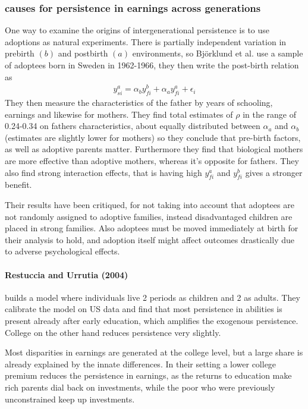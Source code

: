 \documentclass[12pt, a4paper]{article}
\begin{document}
\begin{multicols}{2}
\subsubsection{causes for persistence in earnings across generations}
One way to examine the origins of intergenerational persistence is to use adoptions as natural experiments. There is partially independent variation in prebirth $(b)$ and postbirth $(a)$ environments, so Björklund et al. use a sample of adoptees born in Sweden in 1962-1966, they then write the post-birth relation as 
\begin{align*}
y_{si}^a = \alpha_b y_{fi}^b + \alpha_a y_{fi}^a + \epsilon_i
\end{align*}
They then measure the characteristics of the father by years of schooling, earnings and likewise for mothers. They find total estimates of $\rho$ in the range of 0.24-0.34 on fathers characteristics, about equally distributed between $\alpha_a$ and $\alpha_b$ (estimates are slightly lower for mothers) so they conclude that pre-birth factors, as well as adoptive parents matter. Furthermore they find that biological mothers are more effective than adoptive mothers, whereas it's opposite for fathers. They also find strong interaction effects, that is having high $y_{fi}^a$ and $y_{fi}^b$ gives a stronger benefit.

Their results have been critiqued, for not taking into account that adoptees are not randomly assigned to adoptive families, instead disadvantaged children are placed in strong families. Also adoptees must be moved immediately at birth for their analysis to hold, and adoption itself might affect outcomes drastically due to adverse psychological effects. 

\paragraph{Restuccia and Urrutia (2004)} builds a model where individuals live 2 periods as children and 2 as adults. They calibrate the model on US data and find that most persistence in abilities is present already after early education, which amplifies the exogenous persistence. College on the other hand reduces persistence very slightly.

Most disparities in earnings are generated at the college level, but a large share is already explained by the innate differences. In their setting a lower college premium reduces the persistence in earnings, as the returns to education make rich parents dial back on  investments, while the poor who were previously unconstrained keep up investments. 


\end{multicols}
\end{document}
